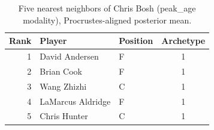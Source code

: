 \begin{table}[htbp]
  \centering\small
  \begin{tabular}{rllc}
    \toprule
    Rank & Player & Position & Archetype \\
    \midrule
    1 & David Andersen & F & 1 \\
    2 & Brian Cook & F & 1 \\
    3 & Wang Zhizhi & C & 1 \\
    4 & LaMarcus Aldridge & F & 1 \\
    5 & Chris Hunter & C & 1 \\
    \bottomrule
  \end{tabular}
  \caption{Five nearest neighbors of Chris Bosh (peak_age modality), Procrustes-aligned posterior mean.}
  \label{tab:Chris_Bosh_neighbors_peak_age}
\end{table}

